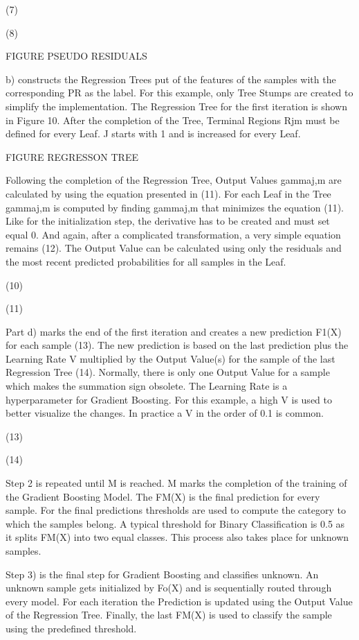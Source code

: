 (7)

(8)

FIGURE PSEUDO RESIDUALS 

b) constructs the Regression Trees put of the features of the samples with the corresponding 
PR as the label. For this example, only Tree Stumps are created to simplify the implementation. 
The Regression Tree for the first iteration is shown in Figure 10. After the completion of the 
Tree, Terminal Regions Rjm must be defined for every Leaf. J starts with 1 and is increased for 
every Leaf. 

FIGURE REGRESSON TREE 

Following the completion of the Regression Tree, Output Values gammaj,m are calculated by using 
the equation presented in (11). For each Leaf in the Tree gammaj,m is computed by finding 
gammaj,m that minimizes the equation (11). Like for the initialization step, the derivative has 
to be created and must set equal 0. And again, after a complicated transformation, a very simple 
equation remains (12). The Output Value can be calculated using only the residuals and the most 
recent predicted probabilities for all samples in the Leaf. 

(10)

(11)

Part d) marks the end of the first iteration and creates a new prediction F1(X) for each sample 
(13). The new prediction is based on the last prediction plus the Learning Rate V multiplied by 
the Output Value(s) for the sample of the last Regression Tree (14). Normally, there is only one 
Output Value for a sample which makes the summation sign obsolete. The Learning Rate is a 
hyperparameter for Gradient Boosting. For this example, a high V is used to better visualize 
the changes. In practice a V in the order of 0.1 is common. 

(13)

(14)

Step 2 is repeated until M is reached. M marks the completion of the training of the Gradient 
Boosting Model. The FM(X) is the final prediction for every sample. For the final predictions 
thresholds are used to compute the category to which the samples belong. A typical threshold 
for Binary Classification is 0.5 as it splits FM(X) into two equal classes. This process also 
takes place for unknown samples. 

Step 3) is the final step for Gradient Boosting and classifies unknown. An unknown sample gets 
initialized by Fo(X) and is sequentially routed through every model. For each iteration the 
Prediction is updated using the Output Value of the Regression Tree. Finally, the last FM(X) 
is used to classify the sample using the predefined threshold. 